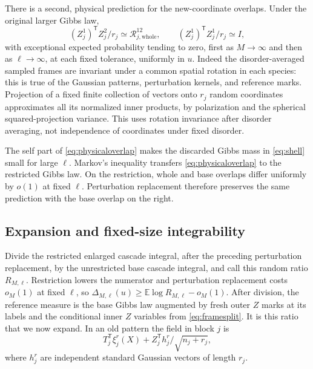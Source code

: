 \documentclass[11pt]{article}
\numberwithin{equation}{section}
\theoremstyle{definition}
\newcommand{\E}{\mathbb E}
\begin{document}
There is a second, physical prediction for the new-coordinate overlaps. Under the original larger Gibbs law,
\begin{equation}\label{eq:physicaloverlap}
(Z_j^1)^{\mathsf T}Z_j^2/r_j\simeq\mathcal R_{j,\mathrm{whole}}^{12},
\qquad (Z_j^1)^{\mathsf T}Z_j^1/r_j\simeq I,
\end{equation}
with exceptional expected probability tending to zero, first as $M\to\infty$ and then as $\ell\to\infty$, at each fixed tolerance, uniformly in $u$. Indeed the disorder-averaged sampled frames are invariant under a common spatial rotation in each species: this is true of the Gaussian patterns, perturbation kernels, and reference marks. Projection of a fixed finite collection of vectors onto $r_j$ random coordinates approximates all its normalized inner products, by polarization and the spherical squared-projection variance. This uses rotation invariance after disorder averaging, not independence of coordinates under fixed disorder.

The self part of \eqref{eq:physicaloverlap} makes the discarded Gibbs mass in \eqref{eq:shell} small for large $\ell$. Markov's inequality transfers \eqref{eq:physicaloverlap} to the restricted Gibbs law. On the restriction, whole and base overlaps differ uniformly by $o(1)$ at fixed $\ell$. Perturbation replacement therefore preserves the same prediction with the base overlap on the right.

\subsection{Expansion and fixed-size integrability}
Divide the restricted enlarged cascade integral, after the preceding perturbation replacement, by the unrestricted base cascade integral, and call this random ratio $R_{M,\ell}$. Restriction lowers the numerator and perturbation replacement costs $o_M(1)$ at fixed $\ell$, so $\Delta_{M,\ell}(u)\ge\E\log R_{M,\ell}-o_M(1)$. After division, the reference measure is the base Gibbs law augmented by fresh outer $Z$ marks at its labels and the conditional inner $Z$ variables from \eqref{eq:framesplit}. It is this ratio that we now expand. In an old pattern the field in block $j$ is
\[
T_j^{\mathsf T}\xi_j^r(X)+Z_j^{\mathsf T}h_j^r/\sqrt{n_j+r_j},
\]
where $h_j^r$ are independent standard Gaussian vectors of length $r_j$.
\end{document}
